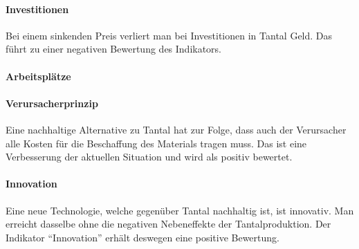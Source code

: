 \paragraph{Investitionen}
Bei einem sinkenden Preis verliert man bei Investitionen in Tantal Geld. Das
führt zu einer negativen Bewertung des Indikators.

\paragraph{Arbeitsplätze}

\paragraph{Verursacherprinzip}
Eine nachhaltige Alternative zu Tantal hat zur Folge, dass auch der Verursacher
alle Kosten für die Beschaffung des Materials tragen muss. Das ist eine
Verbesserung der aktuellen Situation und wird als positiv bewertet.

\paragraph{Innovation}
Eine neue Technologie, welche gegenüber Tantal nachhaltig ist, ist innovativ.
Man erreicht dasselbe ohne die negativen Nebeneffekte der Tantalproduktion. Der
Indikator ``Innovation'' erhält deswegen eine positive Bewertung.
